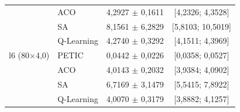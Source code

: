 \begin{table}[htb]
\begin{tabular}{llcc}
         & ACO & 4,2927 $\pm$ 0,1611 & [4,2326; 4,3528] \\
         & SA & 8,1561 $\pm$ 6,2829 & [5,8103; 10,5019] \\
         & Q-Learning & 4,2740 $\pm$ 0,3292 & [4,1511; 4,3969] \\
        \hline
        l6 (80$\times$4,0) & PETIC & 0,0442 $\pm$ 0,0226 & [0,0358; 0,0527] \\
         & ACO & 4,0143 $\pm$ 0,2032 & [3,9384; 4,0902] \\
         & SA & 6,7169 $\pm$ 3,1479 & [5,5415; 7,8922] \\
         & Q-Learning & 4,0070 $\pm$ 0,3179 & [3,8882; 4,1257] \\
        \hline
    \end{tabular}
\end{table}
